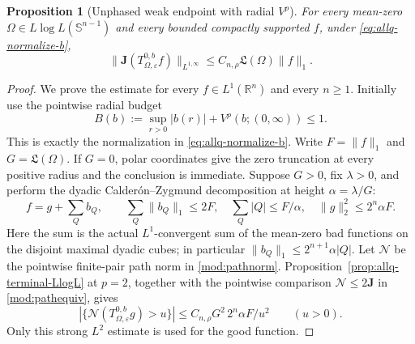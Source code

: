 \documentclass[11pt]{article}
\numberwithin{equation}{section}
\newtheorem{proposition}[theorem]{Proposition}
\theoremstyle{remark}
\theoremstyle{definition}
\newcommand{\R}{\mathbb R}
\newcommand{\Sph}{\mathbb S}
\newcommand{\NN}{\mathcal N}
\begin{document}
\begin{proposition}[Unphased weak endpoint with radial $V^\rho$]
\label{prop:allq-unphased-weak}
For every mean-zero $\Omega\in L\log L(\Sph^{n-1})$ and every bounded
compactly supported $f$, under \eqref{eq:allq-normalize-b},
\begin{equation}\label{eq:allq-unphased-weak}
 \|\mathbf J(T^{0,b}_{\Omega,\varepsilon}f)\|_{L^{1,\infty}}
 \le C_{n,\rho}\mathfrak L(\Omega)\|f\|_1.
\end{equation}
\end{proposition}

\begin{proof}
We prove the estimate for every $f\in L^1(\R^n)$ and every $n\ge1$.
Initially use the pointwise radial budget
\[
 B(b):=\sup_{r>0}|b(r)|+V^\rho(b;(0,\infty))\le1.
\]
This is exactly the normalization in \eqref{eq:allq-normalize-b}.
Write $F=\|f\|_1$ and $G=\mathfrak L(\Omega)$.  If $G=0$, polar
coordinates give the zero truncation at every positive radius and the
conclusion is immediate.  Suppose $G>0$, fix $\lambda>0$, and perform
the dyadic Calder\'on--Zygmund decomposition at height
$\alpha=\lambda/G$:
\[
 f=g+\sum_Qb_Q,\qquad
 \sum_Q\|b_Q\|_1\le2F,\quad
 \sum_Q|Q|\le F/\alpha,\quad
 \|g\|_2^2\le2^n\alpha F.
\]
Here the sum is the actual $L^1$-convergent sum of the mean-zero bad
functions on the disjoint maximal dyadic cubes; in particular
$\|b_Q\|_1\le2^{n+1}\alpha|Q|$.
Let $\NN$ be the pointwise finite-pair path norm in \eqref{mod:pathnorm}.
Proposition~\ref{prop:allq-terminal-LlogL} at $p=2$, together with
the pointwise comparison $\NN\le2\mathbf J$ in
\eqref{mod:pathequiv}, gives
\[
 |\{\NN(T^{0,b}_{\Omega,\varepsilon}g)>u\}|
 \le C_{n,\rho}G^2\,2^n\alpha F/u^2\qquad(u>0).
\]
Only this strong $L^2$ estimate is used for the good function.


\end{proof}
\end{document}
